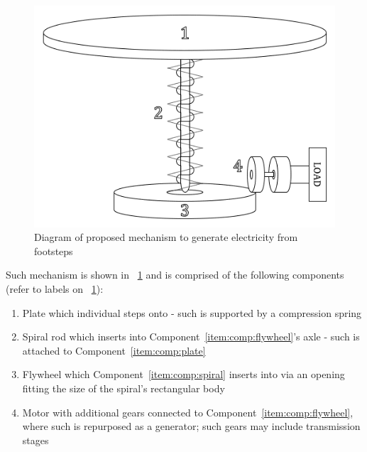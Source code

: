 \documentclass[conference]{IEEEtran}
\newcommand{\figref}[1]{\figurename~\ref{#1}}
\newcommand{\compref}[1]{Component~\ref{#1}}
\begin{document}
\begin{figure}[ht]
    \centering
    \caption{Diagram of proposed mechanism to generate electricity from footsteps}
    \label{fig:mech_wlabel}
    \includegraphics[width=\linewidth]{mech_wlabel.png}
\end{figure}

Such mechanism is shown in \figref{fig:mech_wlabel} and is comprised of the following components (refer to labels on \figref{fig:mech_wlabel}):
\begin{enumerate}
    \item\label{item:comp:plate} Plate which individual steps onto - such is supported by a compression spring
    \item\label{item:comp:spiral} Spiral rod which inserts into \compref{item:comp:flywheel}'s axle - such is attached to \compref{item:comp:plate}
    \item\label{item:comp:flywheel} Flywheel which \compref{item:comp:spiral} inserts into via an opening fitting the size of the spiral's rectangular body
    \item\label{item:comp:motor} Motor with additional gears connected to \compref{item:comp:flywheel}, where such is repurposed as a generator; such gears may include transmission stages
\end{enumerate}
\end{document}
